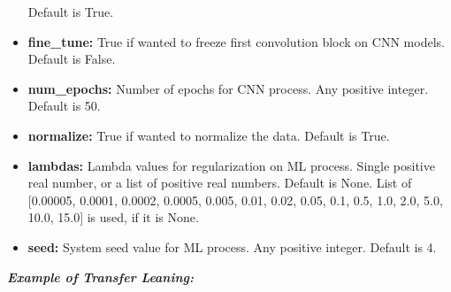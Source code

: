 \begin{itemize}
	Default is True.\\
	\item
	\textbf{fine\_tune:} True if wanted to freeze first convolution block on CNN
	models. Default is False.\\
	\item
	\textbf{num\_epochs:} Number of epochs for CNN process. Any positive integer.
	Default is 50.\\
	\item
	\textbf{normalize:} True if wanted to normalize the data. Default is True.\\
	\item
	\textbf{lambdas:} Lambda values for regularization on ML process. Single
	positive real number, or a list of positive real numbers. Default is
	None. List of {[}0.00005, 0.0001, 0.0002, 0.0005, 0.005, 0.01, 0.02,
	0.05, 0.1, 0.5, 1.0, 2.0, 5.0, 10.0, 15.0{]} is used, if it is None.\\
	\item
	\textbf{seed:} System seed value for ML process. Any positive integer. Default
	is 4.
\end{itemize}

\textbf{\emph{Example of Transfer Leaning:}}

